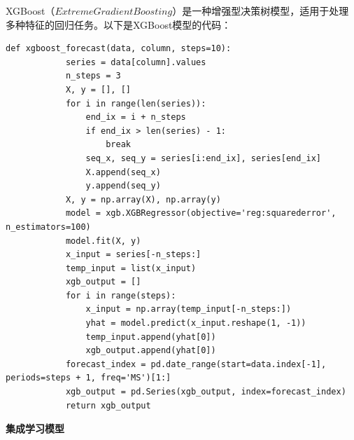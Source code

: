 \documentclass[a4paper]{article}
\begin{document}
	XGBoost（$Extreme Gradient Boosting$）是一种增强型决策树模型，适用于处理多种特征的回归任务。以下是XGBoost模型的代码：
	\begin{lstlisting}[caption={Python Example}, label={lst:example}]
		def xgboost_forecast(data, column, steps=10):
			series = data[column].values
			n_steps = 3
			X, y = [], []
			for i in range(len(series)):
				end_ix = i + n_steps
				if end_ix > len(series) - 1:
					break
				seq_x, seq_y = series[i:end_ix], series[end_ix]
				X.append(seq_x)
				y.append(seq_y)
			X, y = np.array(X), np.array(y)
			model = xgb.XGBRegressor(objective='reg:squarederror', n_estimators=100)
			model.fit(X, y)
			x_input = series[-n_steps:]
			temp_input = list(x_input)
			xgb_output = []
			for i in range(steps):
				x_input = np.array(temp_input[-n_steps:])
				yhat = model.predict(x_input.reshape(1, -1))
				temp_input.append(yhat[0])
				xgb_output.append(yhat[0])
			forecast_index = pd.date_range(start=data.index[-1], periods=steps + 1, freq='MS')[1:]
			xgb_output = pd.Series(xgb_output, index=forecast_index)
			return xgb_output

	\end{lstlisting}

	\textbf{集成学习模型}
\end{document}
